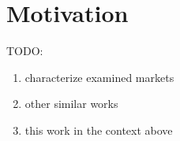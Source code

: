 \section{Motivation} \label{sec:motivation}
TODO:
\begin{enumerate}
\item characterize examined markets
\item other similar works
\item this work in the context above
\end{enumerate}
